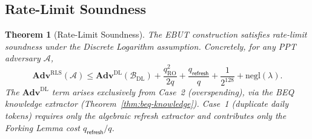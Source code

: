 \documentclass[11pt]{article}
\theoremstyle{definitionstyle}
\newtheorem{theorem}{Theorem}[section]
\theoremstyle{plain}
\newcommand{\advantage}[1]{\mathbf{Adv}^{\mathrm{#1}}}
\newcommand{\negl}{\mathrm{negl}}
\begin{document}
\subsection{Rate-Limit Soundness}

\begin{theorem}[Rate-Limit Soundness]
The EBUT construction satisfies rate-limit soundness under the Discrete Logarithm assumption. Concretely, for any PPT adversary $\mathcal{A}$,
\[
\advantage{RLS}(\mathcal{A}) \le \advantage{DL}(\mathcal{B}_{\text{DL}}) + \frac{q_{\text{RO}}^2}{2q} + \frac{q_{\mathsf{refresh}}}{q} + \frac{1}{2^{128}} + \negl(\lambda).
\]
The $\advantage{DL}$ term arises exclusively from Case~2 (overspending), via the BEQ knowledge extractor (Theorem~\ref{thm:beq-knowledge}). Case~1 (duplicate daily tokens) requires only the algebraic refresh extractor and contributes only the Forking Lemma cost $q_{\mathsf{refresh}}/q$.
\end{theorem}
\end{document}
